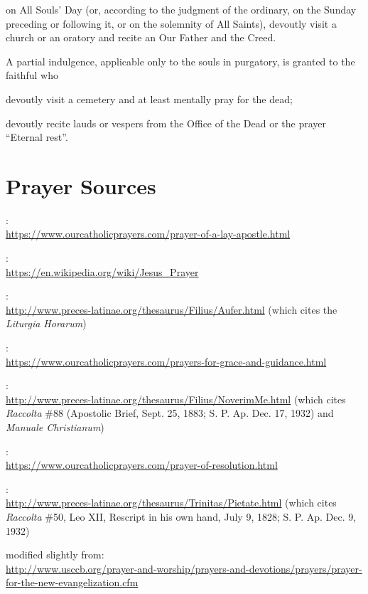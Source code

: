 \documentclass[12pt]{article}
\newcommand{\emphasis}[1]{\emph{#1}}
\newcommand{\emphasis}[1]{\textsl{#1}}
\newcommand{\foreign}[1]{\emphasis{#1}}
\begin{document}
 on All Souls' Day (or, according to the judgment of the ordinary, on the Sunday preceding or following it, or on the solemnity of All Saints), devoutly visit a church or an oratory and recite an Our Father and the Creed.

 A partial indulgence, applicable only to the souls in purgatory, is granted to the faithful who

 devoutly visit a cemetery and at least mentally pray for the dead;

 devoutly recite lauds or vespers from the Office of the Dead or the prayer ``Eternal rest''.

\newpage
\section{Prayer Sources}
\newcommand{\urlsource}[1]{:\\{\footnotesize\url{#1}}}

\urlsource{https://www.ourcatholicprayers.com/prayer-of-a-lay-apostle.html}

\urlsource{https://en.wikipedia.org/wiki/Jesus_Prayer}

\urlsource{http://www.preces-latinae.org/thesaurus/Filius/Aufer.html} (which cites the \foreign{Liturgia Horarum})

\urlsource{https://www.ourcatholicprayers.com/prayers-for-grace-and-guidance.html}

\urlsource{http://www.preces-latinae.org/thesaurus/Filius/NoverimMe.html} (which cites \foreign{Raccolta} \#88 (Apostolic Brief, Sept. 25, 1883; S. P. Ap. Dec. 17, 1932) and \foreign{Manuale Christianum})

\urlsource{https://www.ourcatholicprayers.com/prayer-of-resolution.html}

\urlsource{http://www.preces-latinae.org/thesaurus/Trinitas/Pietate.html} (which cites \foreign{Raccolta} \#50, Leo XII, Rescript in his own hand, July 9, 1828; S. P. Ap. Dec. 9, 1932)

 modified slightly from\urlsource{http://www.usccb.org/prayer-and-worship/prayers-and-devotions/prayers/prayer-for-the-new-evangelization.cfm}
\end{document}
